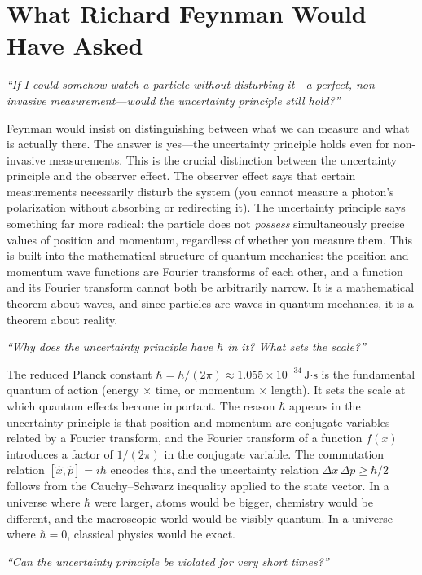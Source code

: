 \section*{What Richard Feynman Would Have Asked}

\textit{``If I could somehow watch a particle without disturbing it---a perfect, non-invasive measurement---would the uncertainty principle still hold?''}

Feynman would insist on distinguishing between what we can measure and what is actually there. The answer is yes---the uncertainty principle holds even for non-invasive measurements. This is the crucial distinction between the uncertainty principle and the observer effect. The observer effect says that certain measurements necessarily disturb the system (you cannot measure a photon's polarization without absorbing or redirecting it). The uncertainty principle says something far more radical: the particle does not \emph{possess} simultaneously precise values of position and momentum, regardless of whether you measure them. This is built into the mathematical structure of quantum mechanics: the position and momentum wave functions are Fourier transforms of each other, and a function and its Fourier transform cannot both be arbitrarily narrow. It is a mathematical theorem about waves, and since particles are waves in quantum mechanics, it is a theorem about reality.

\textit{``Why does the uncertainty principle have $\hbar$ in it? What sets the scale?''}

The reduced Planck constant $\hbar = h/(2\pi) \approx 1.055 \times 10^{-34}\,\text{J·s}$ is the fundamental quantum of action (energy $\times$ time, or momentum $\times$ length). It sets the scale at which quantum effects become important. The reason $\hbar$ appears in the uncertainty principle is that position and momentum are conjugate variables related by a Fourier transform, and the Fourier transform of a function $f(x)$ introduces a factor of $1/(2\pi)$ in the conjugate variable. The commutation relation $[\hat{x},\hat{p}] = i\hbar$ encodes this, and the uncertainty relation $\Delta x\,\Delta p \geq \hbar/2$ follows from the Cauchy--Schwarz inequality applied to the state vector. In a universe where $\hbar$ were larger, atoms would be bigger, chemistry would be different, and the macroscopic world would be visibly quantum. In a universe where $\hbar = 0$, classical physics would be exact.

\textit{``Can the uncertainty principle be violated for very short times?''}

